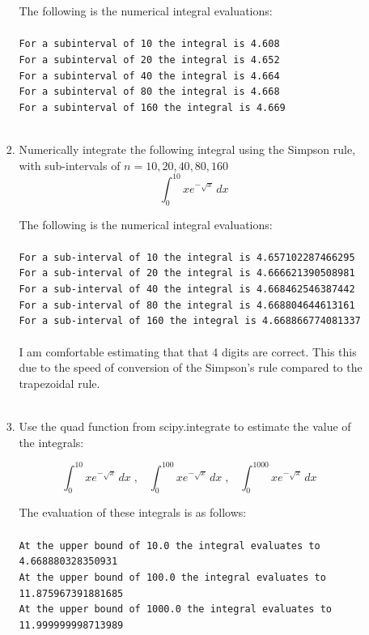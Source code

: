 \documentclass[a4paper,11pt]{article}
\begin{document}
\begin{preview}
\begin{enumerate}
\begin{enumerate}
\begin{enumerate}
            The following is the numerical integral evaluations:\\\\
            \texttt{For a subinterval of 10 the integral is 4.608\\
            For a subinterval of 20 the integral is 4.652\\
            For a subinterval of 40 the integral is 4.664\\
            For a subinterval of 80 the integral is 4.668\\
            For a subinterval of 160 the integral is 4.669\\\\}

        \item Numerically integrate the following integral using the  Simpson rule, with sub-intervals of $n = 10,20,40,80,160$
        $$ \int_{0}^{10} xe^{-\sqrt{x}} \,dx $$

        The following is the numerical integral evaluations:\\\\
        \texttt{For a sub-interval of 10 the integral is 4.657102287466295\\
        For a sub-interval of 20 the integral is 4.666621390508981\\
        For a sub-interval of 40 the integral is 4.668462546387442\\
        For a sub-interval of 80 the integral is 4.668804644613161\\
        For a sub-interval of 160 the integral is 4.668866774081337\\\\}
        I am comfortable estimating that that 4 digits are correct. This this due to the speed of conversion of the Simpson's rule compared to the trapezoidal rule.\\\\

        \item Use the quad function from scipy.integrate to estimate the value of the integrals:

        $$ \int_{0}^{10} xe^{-\sqrt{x}}\,dx \; , \;\;\;\int_{0}^{100} xe^{-\sqrt{x}} \,dx \; , \;\;\; \int_{0}^{1000} xe^{-\sqrt{x}} \,dx \;\;\; $$
        
        The evaluation of these integrals is as follows:\\\\
        \texttt{At the upper bound of 10.0 the integral evaluates to 4.668880328350931\\
        At the upper bound of 100.0 the integral evaluates to 11.875967391881685\\
        At the upper bound of 1000.0 the integral evaluates to 11.999999998713989\\\\}


\end{enumerate}
\end{enumerate}
\end{enumerate}
\end{preview}
\end{document}
